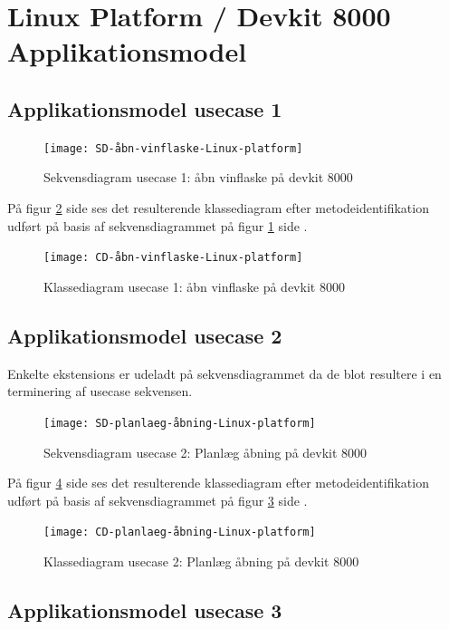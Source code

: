\section{Linux Platform / Devkit 8000 Applikationsmodel}

\subsection{Applikationsmodel usecase 1}
\begin{figure}[H]
\caption{Sekvensdiagram usecase 1: åbn vinflaske på devkit 8000}
\label{SD:UC1-devkit}
\texttt{[image: SD-åbn-vinflaske-Linux-platform]}
\end{figure}

På figur \ref{CD:UC1-devkit} side \pageref{CD:UC1-devkit} ses det resulterende klassediagram efter metodeidentifikation udført på basis af sekvensdiagrammet på figur \ref{SD:UC1-devkit} side \pageref{SD:UC1-devkit}.
\begin{figure}[H]
	\caption{Klassediagram usecase 1: åbn vinflaske på devkit 8000}
	\label{CD:UC1-devkit}
	\texttt{[image: CD-åbn-vinflaske-Linux-platform]}
\end{figure}

\subsection{Applikationsmodel usecase 2}

Enkelte ekstensions er udeladt på sekvensdiagrammet da de blot resultere i en terminering af usecase sekvensen.

\begin{figure}[H]
	\caption{Sekvensdiagram usecase 2: Planlæg åbning på devkit 8000}
	\label{SD:UC2-devkit}
	\texttt{[image: SD-planlaeg-åbning-Linux-platform]}
\end{figure}

På figur \ref{CD:UC2-devkit} side \pageref{CD:UC2-devkit} ses det resulterende klassediagram efter metodeidentifikation udført på basis af sekvensdiagrammet på figur \ref{SD:UC2-devkit} side \pageref{SD:UC2-devkit}.
\begin{figure}[H]
	\caption{Klassediagram usecase 2: Planlæg åbning på devkit 8000}
	\label{CD:UC2-devkit}
	\texttt{[image: CD-planlaeg-åbning-Linux-platform]}
\end{figure}

\subsection{Applikationsmodel usecase 3}

